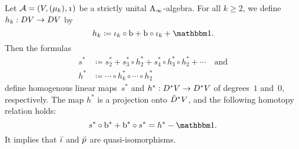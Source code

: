 \documentclass[\MainFolder/Text.tex]{subfiles}
\begin{document}
\begin{Lemma}[CP4] \label{Lem:CP4}
Let $\mathcal{A} = (V,(\mu_k),\NOne)$ be a strictly unital $\mathrm{A}_\infty$-algebra. For all $k\ge 2$, we define $h_k: D V \rightarrow D V$ by
\[ h_k\coloneqq \InsOneOp_k \circ \Hd + \Hd\circ \InsOneOp_k + \Id. \]
Then the formulas
\begin{align*}
    s^* &\coloneqq  s^*_2 + s^*_3 \circ h^*_2 + s^*_4 \circ h^*_3 \circ h_2^* + \dotsb\quad\text{and} \\
    h^* &\coloneqq \dotsb\circ h^*_k\circ\dotsb\circ h^*_2
\end{align*}
define homogenous linear maps~$s^*$ and $h^*: D^*V \rightarrow D^* V$ of degrees~$1$ and~$0$, respectively. The map $h^*$ is a projection onto $\bar{D}^* V$, and the following homotopy relation holds:
\begin{equation} \label{Eq:Homot}
s^* \circ \Hd^* + \Hd^* \circ s^* = h^* - \Id.
\end{equation}
It implies that $\bar{\iota}$ and $\bar{p}$ are quasi-isomorphisms.
\end{Lemma}
\end{document}
